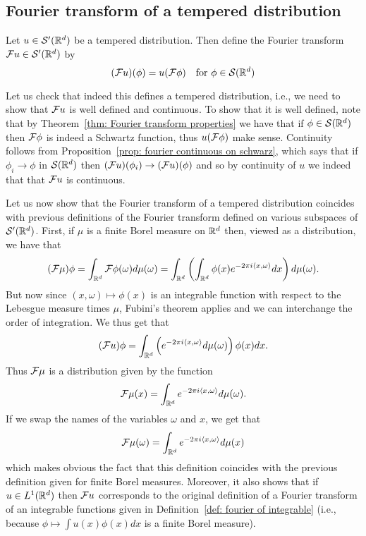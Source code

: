 \documentclass[twoside, a4paper, 10pt]{amsart}
\begin{document}
\subsection{Fourier transform of a tempered distribution}

\begin{mydef} Let $u \in \mathcal{S}'(\mathbb{R}^d)$ be a tempered distribution. Then define the Fourier transform $\mathcal{F} u \in \mathcal{S}'(\mathbb{R}^d)$ by $$(\mathcal{F} u)(\phi) = u(\mathcal{F} \phi) \quad \text{for } \phi \in \mathcal{S}(\mathbb{R}^d)$$

\end{mydef}

Let us check that indeed this defines a tempered distribution, i.e., we need to show that $\mathcal{F} u$ is well defined and continuous. To show that it is well defined, note that by Theorem~\ref{thm: Fourier transform properties} we have that if $\phi \in \mathcal{S}(\mathbb{R}^d)$ then $\mathcal{F} \phi$ is indeed a Schwartz function, thus $u(\mathcal{F} \phi)$ make sense. Continuity follows from Proposition~\ref{prop: fourier continuous on schwarz}, which says that if $\phi_i \to \phi$ in $\mathcal{S}(\mathbb{R}^d)$ then $(\mathcal{F} u) (\phi_i) \to (\mathcal{F} u) (\phi)$ and so by continuity of $u$ we indeed that that $\mathcal{F} u$ is continuous.

Let us now show that the Fourier transform of a tempered distribution coincides with previous definitions of the Fourier transform defined on various subspaces of $\mathcal{S}'(\mathbb{R}^d)$. First, if $\mu$ is a finite Borel measure on $\mathbb{R}^d$ then, viewed as a distribution, we have that $$(\mathcal{F} \mu) \phi = \int_{\mathbb{R}^d} \mathcal{F} \phi (\omega) d\mu(\omega) = \int_{\mathbb{R}^d} \left( \int_{\mathbb{R}^d} \phi(x) e^{-2\pi i \langle x ,\omega \rangle} dx \right) d\mu(\omega).$$ But now since $(x,\omega) \mapsto \phi(x)$ is an integrable function with respect to the Lebesgue measure times $\mu$, Fubini's theorem applies and we can interchange the order of integration. We thus get that $$(\mathcal{F} u)\phi = \int_{\mathbb{R}^d} \left(e^{-2\pi i \langle x ,\omega \rangle} d\mu(\omega) \right) \phi(x) dx.$$ Thus $\mathcal{F}\mu$ is a distribution given by the function $$\mathcal{F} \mu (x) = \int_{\mathbb{R}^d} e^{-2\pi i \langle x ,\omega \rangle} d \mu(\omega).$$ If we swap the names of the variables $\omega$ and $x$, we get that $$\mathcal{F} \mu (\omega) = \int_{\mathbb{R}^d} e^{-2\pi i \langle x ,\omega \rangle} d \mu(x)$$ which makes obvious the fact that this definition coincides with the previous definition given for finite Borel measures. Moreover, it also shows that if $u \in L^1(\mathbb{R}^d)$ then $\mathcal{F} u$ corresponds to the original definition of a Fourier transform of an integrable functions given in Definition~\ref{def: fourier of integrable} (i.e., because $\phi \mapsto \int u(x)\phi(x) dx$ is a finite Borel measure).
\end{document}
